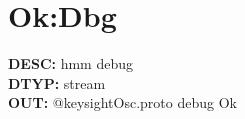 \documentclass[12pt]{article}
\begin{document}
\section{Ok:Dbg}
\textbf{DESC: }hmm debug \\
\textbf{DTYP: }stream \\
\textbf{OUT: }@keysightOsc.proto debug Ok \\
\newpage
\end{document}

